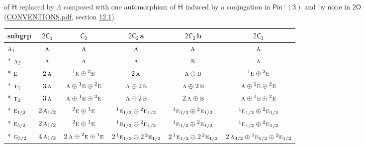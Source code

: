 \documentclass[10pt,a4paper]{article}
\numberwithin{equation}{section}
\newcommand{\grp}[1]{\mathsf{#1}}
\newcommand{\irr}[1]{\text{\normalfont\scshape #1}}
\newcommand{\conjpair}[1]{{}^{#1}}
\newcommand{\clsletter}[1]{\,{\scriptsize\color{black!55}#1}}
\begin{document}
of $\grp{H}$ replaced by $\Lambda$ composed with one automorphism of $\grp{H}$ induced by a conjugation in \href{Pinminus3.pdf}{$\grp{Pin^{-}(3)}$} and by none in $\grp{2O}$ (\href{../../CONVENTIONS.pdf}{CONVENTIONS.pdf}, section \href{../../../rotation/CONVENTIONS.pdf\#conv.12.1}{12.1}).
{\small\begin{longtable}{@{}lccccc@{}}\toprule
subgrp & \href{2C1.pdf}{$\grp{2C_{1}}$} & \href{C3.pdf}{$\grp{C_{3}}$} & \href{2C2.pdf}{$\grp{2C_{2}}$}\clsletter{a} & \href{2C2.pdf}{$\grp{2C_{2}}$}\clsletter{b} & \href{2C3.pdf}{$\grp{2C_{3}}$}\\\midrule\endhead
\bottomrule\endfoot\endlastfoot
$\irr{a}_{1}$ & $\irr{a}$ & $\irr{a}$ & $\irr{a}$ & $\irr{a}$ & $\irr{a}$\\*
$\irr{a}_{2}$ & $\irr{a}$ & $\irr{a}$ & $\irr{a}$ & $\irr{b}$ & $\irr{a}$\\*
$\irr{e}$ & $2\,\irr{a}$ & $\conjpair{1}\irr{e}\oplus \conjpair{2}\irr{e}$ & $2\,\irr{a}$ & $\irr{a}\oplus \irr{b}$ & $\conjpair{1}\irr{e}\oplus \conjpair{2}\irr{e}$\\*
$\irr{t}_{1}$ & $3\,\irr{a}$ & $\irr{a}\oplus \conjpair{1}\irr{e}\oplus \conjpair{2}\irr{e}$ & $\irr{a}\oplus 2\,\irr{b}$ & $\irr{a}\oplus 2\,\irr{b}$ & $\irr{a}\oplus \conjpair{1}\irr{e}\oplus \conjpair{2}\irr{e}$\\*
$\irr{t}_{2}$ & $3\,\irr{a}$ & $\irr{a}\oplus \conjpair{1}\irr{e}\oplus \conjpair{2}\irr{e}$ & $\irr{a}\oplus 2\,\irr{b}$ & $2\,\irr{a}\oplus \irr{b}$ & $\irr{a}\oplus \conjpair{1}\irr{e}\oplus \conjpair{2}\irr{e}$\\*
$\irr{e}_{1/2}$ & $2\,\irr{a}_{1/2}$ & $\conjpair{2}\irr{e}\oplus \conjpair{1}\irr{e}$ & $\conjpair{1}\irr{e}_{1/2}\oplus \conjpair{2}\irr{e}_{1/2}$ & $\conjpair{1}\irr{e}_{1/2}\oplus \conjpair{2}\irr{e}_{1/2}$ & $\conjpair{1}\irr{e}_{1/2}\oplus \conjpair{2}\irr{e}_{1/2}$\\*
$\irr{e}_{5/2}$ & $2\,\irr{a}_{1/2}$ & $\conjpair{2}\irr{e}\oplus \conjpair{1}\irr{e}$ & $\conjpair{1}\irr{e}_{1/2}\oplus \conjpair{2}\irr{e}_{1/2}$ & $\conjpair{1}\irr{e}_{1/2}\oplus \conjpair{2}\irr{e}_{1/2}$ & $\conjpair{1}\irr{e}_{1/2}\oplus \conjpair{2}\irr{e}_{1/2}$\\*
$\irr{g}_{3/2}$ & $4\,\irr{a}_{1/2}$ & $2\,\irr{a}\oplus \conjpair{2}\irr{e}\oplus \conjpair{1}\irr{e}$ & $2\,\conjpair{1}\irr{e}_{1/2}\oplus 2\,\conjpair{2}\irr{e}_{1/2}$ & $2\,\conjpair{1}\irr{e}_{1/2}\oplus 2\,\conjpair{2}\irr{e}_{1/2}$ & $2\,\irr{a}_{3/2}\oplus \conjpair{1}\irr{e}_{1/2}\oplus \conjpair{2}\irr{e}_{1/2}$\\
\bottomrule\end{longtable}}
\end{document}
